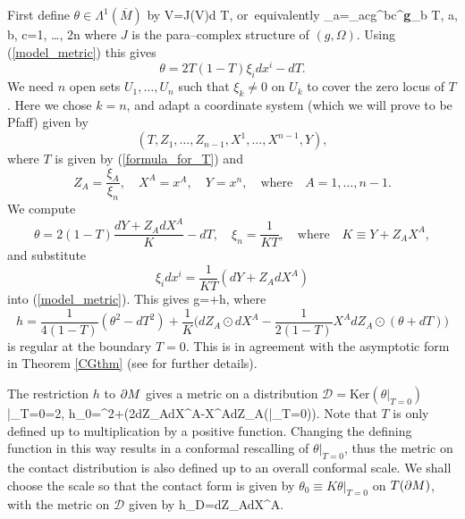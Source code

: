 First define $\theta\in \Lambda^1(\overline{M})$
by 
\be
\label{def_theta}
V\hook \theta=J(V)\hook d T, \quad\mbox{or equivalently}\quad 
\theta_a=\Omega_{ac}g^{bc}{{\nabla}^{\bf g}}_b T, \quad a, b, c=1, \dots, 2n
\ee
where $J$ is the para--complex structure of $(g,  \Omega)$. Using (\ref{model_metric}) this  gives
\[
\theta=2T(1-T)\xi_id x^i-dT.
\]
We need $n$  open sets $U_1, \dots, U_n$ such that $\xi_k\neq 0$ on $U_k$
to cover the zero locus of $T$. Here we chose $k=n$, and adapt
a coordinate system (which we will prove to be Pfaff) given by
\[
(T, Z_1, \dots, Z_{n-1}, X^1, \dots,
 X^{n-1}, Y),
\] 
where $T$ is
given by (\ref{formula_for_T}) and
\[
Z_A=\frac {\xi_A}{\xi_n}, \quad X^A=x^A, \quad Y=x^{n}, \quad\mbox{where}\quad
A=1, \dots, n-1.
\]
We compute
\[
\theta=2(1-T)\frac{dY+Z_AdX^A}{K}-dT, \quad
\xi_n=\frac{1}{KT}, \quad \mbox{where}\quad K\equiv Y+Z_AX^A,
\]
and substitute
\[
\xi_i dx^i=\frac{1}{KT}(dY+Z_AdX^A)
\]
into (\ref{model_metric}). This gives
\be
\label{CG_Form}
g=+h,
\ee
where 
\[
h=\frac{1}{4(1-T)}(\theta^2-dT^2)+\frac{1}{K}\Big(dZ_A\odot dX^A-\frac{1}{2(1-T)}X^A dZ_A\odot(\theta+dT)\Big)
\]
is regular at the boundary $T=0$. This is in agreement with the 
asymptotic form in Theorem \ref{CGthm} (see \cite{CG} for further details).

The restriction $h$ to $\partial M$ gives a metric on a distribution ${\mathcal D}=\mbox{Ker} (\theta|_{T=0})$
\be
\label{h000}
\theta|_{T=0}=2, \quad h_0=^2+(2dZ_A\odot dX^A-X^AdZ_A\odot(\theta|_{T=0})).
\ee
 Note that $T$ is only defined up to multiplication by a positive function. Changing the defining function in this way results in a conformal rescalling of $\theta|_{T=0}$, thus the metric on the contact distribution is also defined up to an overall conformal scale. We shall choose the scale so that
the contact form is given  by $\theta_0\equiv K\theta|_{T=0}$ on $T(\partial M)$,
with the metric on ${\mathcal D}$ given by
\be
\label{on_distri}
h_{\mathcal D}=dZ_A\odot dX^A.
\ee

